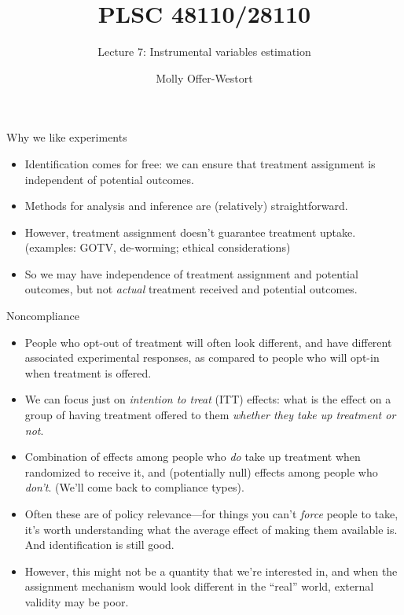 \documentclass[xcolor={dvipsnames},handout]{beamer}
\title{PLSC 48110/28110}
\subtitle{Lecture 7: Instrumental variables estimation}
\date{}
\author{Molly Offer-Westort}
\institute{Department of Political Science, \\University of Chicago}
\begin{document}
\frame{\titlepage
\thispagestyle{empty}
}
\begin{frame}{Why we like experiments}

\begin{itemize}
\item Identification comes for free: we can ensure that treatment assignment is independent of potential outcomes.
\item Methods for analysis and inference are (relatively) straightforward.
\item However, treatment assignment doesn't guarantee treatment uptake.  (examples: GOTV, de-worming; ethical considerations)
\item So we may have independence of treatment assignment and potential outcomes, but not \textit{actual} treatment received and potential outcomes.
\end{itemize}

\end{frame}



\begin{frame}{Noncompliance}

\begin{itemize}
\item People who opt-out of treatment will often look different, and have different associated experimental responses, as compared to people who will opt-in when treatment is offered.
\item We can focus just on \textit{intention to treat} (ITT) effects: what is the effect on a group of having treatment offered to them  \textit{whether they take up treatment or not}.
\item Combination of effects among people who \textit{do} take up treatment when randomized to receive it, and (potentially null) effects among people who \textit{don't}.  (We'll come back to compliance types).
\item Often these are of policy relevance—for things you can't \textit{force} people to take, it's worth understanding what the average effect of making them available is.  And identification is still good.
\item However, this might not be a quantity that we're interested in, and when the assignment mechanism would look different in the ``real'' world, external validity may be poor.
\end{itemize}

\end{frame}
\end{document}
